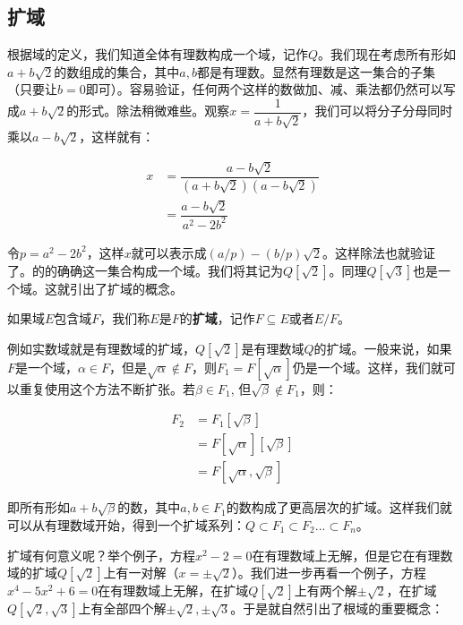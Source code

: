 \documentclass[b5paper]{ctexart}
\begin{document}
\subsection{扩域}
根据域的定义，我们知道全体有理数构成一个域，记作$Q$。我们现在考虑所有形如$a + b\sqrt{2}$的数组成的集合，其中$a, b$都是有理数\cite{Goodman2011}。显然有理数是这一集合的子集（只要让$b=0$即可）。容易验证，任何两个这样的数做加、减、乘法都仍然可以写成$a + b \sqrt{2}$的形式。除法稍微难些。观察$x = \dfrac{1}{a + b\sqrt{2}}$，我们可以将分子分母同时乘以$a - b \sqrt{2}$，这样就有：

\[
\begin{array}{rl}
x & = \dfrac{a - b \sqrt{2}}{(a + b \sqrt{2})(a - b \sqrt{2})} \\[2ex]
  & = \dfrac{a - b \sqrt{2}}{a^2 - 2b^2}
\end{array}
\]

令$p = a^2 - 2b^2$，这样$x$就可以表示成$(a/p) -(b/p)\sqrt{2}$。这样除法也就验证了。的的确确这一集合构成一个域。我们将其记为$Q[\sqrt{2}]$。同理$Q[\sqrt{3}]$也是一个域。这就引出了扩域的概念。

\begin{definition}
如果域$E$包含域$F$，我们称$E$是$F$的\textbf{扩域}，记作$F \subseteq E$或者$E/F$。
\end{definition}

例如实数域就是有理数域的扩域，$Q[\sqrt{2}]$是有理数域$Q$的扩域。一般来说，如果$F$是一个域，$\alpha \in F$，但是$\sqrt{\alpha} \not\in F$，则$F_1 = F[\sqrt{\alpha}]$仍是一个域。这样，我们就可以重复使用这个方法不断扩张。若$\beta \in F_1$, 但$\sqrt{\beta} \not\in F_1$，则：

\[
\begin{array}{rl}
F_2 & = F_1[\sqrt{\beta}] \\
    & = F[\sqrt{\alpha}][\sqrt{\beta}] \\
    & = F[\sqrt{\alpha}, \sqrt{\beta}]
\end{array}
\]

即所有形如$a + b \sqrt{\beta}$的数，其中$a, b \in F_1$的数构成了更高层次的扩域。这样我们就可以从有理数域开始，得到一个扩域系列：$Q \subset F_1 \subset F_2 ... \subset F_n$。

扩域有何意义呢？举个例子，方程$x^2 - 2 = 0$在有理数域上无解，但是它在有理数域的扩域$Q[\sqrt{2}]$上有一对解（$x = \pm \sqrt{2}$）。我们进一步再看一个例子，方程$x^4 - 5x^2 + 6 = 0$在有理数域上无解，在扩域$Q[\sqrt{2}]$上有两个解$\pm \sqrt{2}$，在扩域$Q[\sqrt{2}, \sqrt{3}]$上有全部四个解$\pm \sqrt{2}, \pm \sqrt{3}$。于是就自然引出了根域的重要概念：
\end{document}
